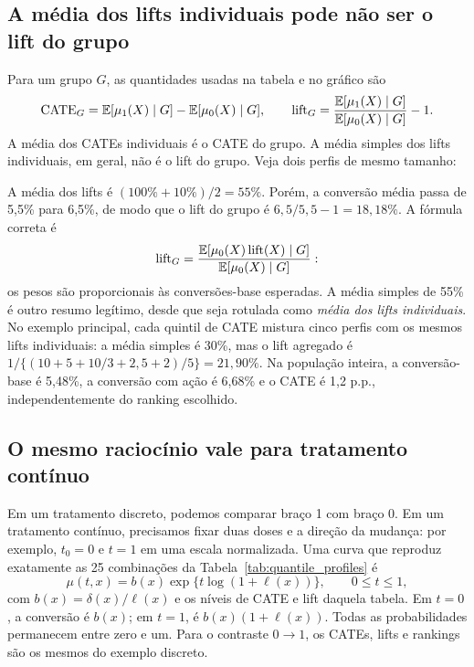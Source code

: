 \subsection{A média dos lifts individuais pode não ser o lift do grupo}
Para um grupo $G$, as quantidades usadas na tabela e no gráfico são
\[
\mathrm{CATE}_G=\mathbb E[\mu_1(X)\mid G]-\mathbb E[\mu_0(X)\mid G],\qquad
\mathrm{lift}_G=\frac{\mathbb E[\mu_1(X)\mid G]}{\mathbb E[\mu_0(X)\mid G]}-1.
\]
A média dos CATEs individuais é o CATE do grupo. A média simples dos lifts individuais, em geral, não é o lift do grupo. Veja dois perfis de mesmo tamanho:

\begin{table}[H]
\centering\small
\caption{Dois perfis com pesos iguais: média individual de 55\%, lift do grupo de 18,18\%.}
\label{tab:quantile_mixture}

\end{table}

A média dos lifts é $(100\%+10\%)/2=55\%$. Porém, a conversão média passa de 5,5\% para 6,5\%, de modo que o lift do grupo é $6{,}5/5{,}5-1=18{,}18\%$. A fórmula correta é
\[
\mathrm{lift}_G
=\frac{\mathbb E[\mu_0(X)\,\mathrm{lift}(X)\mid G]}{\mathbb E[\mu_0(X)\mid G]}:
\]
os pesos são proporcionais às conversões-base esperadas. A média simples de 55\% é outro resumo legítimo, desde que seja rotulada como \emph{média dos lifts individuais}. No exemplo principal, cada quintil de CATE mistura cinco perfis com os mesmos lifts individuais: a média simples é 30\%, mas o lift agregado é $1/\{(10+5+10/3+2{,}5+2)/5\}=21{,}90\%$. Na população inteira, a conversão-base é 5,48\%, a conversão com ação é 6,68\% e o CATE é 1,2 p.p., independentemente do ranking escolhido.

\clearpage
\subsection{O mesmo raciocínio vale para tratamento contínuo}
Em um tratamento discreto, podemos comparar braço 1 com braço 0. Em um tratamento contínuo, precisamos fixar duas doses e a direção da mudança: por exemplo, $t_0=0$ e $t=1$ em uma escala normalizada. Uma curva que reproduz exatamente as 25 combinações da Tabela~\ref{tab:quantile_profiles} é
\[
\mu(t,x)=b(x)\exp\{t\log(1+\ell(x))\},\qquad 0\leq t\leq1,
\]
com $b(x)=\delta(x)/\ell(x)$ e os níveis de CATE e lift daquela tabela. Em $t=0$, a conversão é $b(x)$; em $t=1$, é $b(x)(1+\ell(x))$. Todas as probabilidades permanecem entre zero e um. Para o contraste $0\to1$, os CATEs, lifts e rankings são os mesmos do exemplo discreto.

